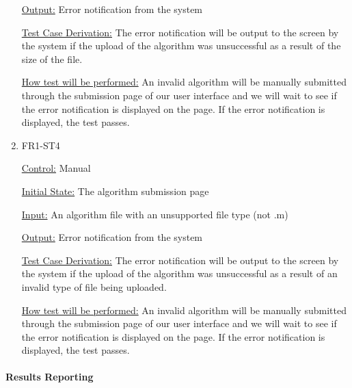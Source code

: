 \documentclass[12pt, titlepage]{article}
\begin{document}
\begin{enumerate}
\underline{Output:} Error notification from the system

\underline{Test Case Derivation:} The error notification will be output to the screen by the system if the upload of the algorithm was unsuccessful as a result of the size of the file.

\underline{How test will be performed:} An invalid algorithm will be manually submitted through the submission page of our user interface and we will wait to see if the error notification is displayed on the page. If the error notification is displayed, the test passes.

\item{FR1-ST4\\}

\underline{Control:} Manual

\underline{Initial State:} The algorithm submission page

\underline{Input:} An algorithm file with an unsupported file type (not .m)

\underline{Output:} Error notification from the system

\underline{Test Case Derivation:} The error notification will be output to the screen by the system if the upload of the algorithm was unsuccessful as a result of an invalid type of file being uploaded.

\underline{How test will be performed:} An invalid algorithm will be manually submitted through the submission page of our user interface and we will wait to see if the error notification is displayed on the page. If the error notification is displayed, the test passes.

\end{enumerate}

\paragraph{Results Reporting}
\end{document}
